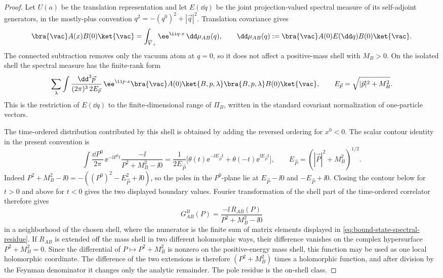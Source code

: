 \begin{proof}
Let \(U(a)\) be the translation representation and let \(E(\dd q)\) be the
joint projection-valued spectral measure of its self-adjoint generators, in
the mostly-plus convention \(q^2=-(q^0)^2+|\vec q|^2\).  Translation
covariance gives
\[
  \bra{\vac}A(x)B(0)\ket{\vac}
  =
  \int_{\overline V_+}
    \ee^{\ii q\cdot x}\,
    \dd\mu_{AB}(q),
  \qquad
  \dd\mu_{AB}(q)
  :=
  \bra{\vac}A(0)E(\dd q)B(0)\ket{\vac}.
\]
The connected subtraction removes only the vacuum atom at \(q=0\), so it
does not affect a positive-mass shell with \(M_B>0\).  On the isolated shell
the spectral measure has the finite-rank form
\[
  \sum_{\lambda}
  \int\frac{\dd^3\vec p}{(2\pi)^3\,2E_{\vec p}}\,
  \ee^{\ii p\cdot x}
  \bra{\vac}A(0)\ket{B,p,\lambda}
  \bra{B,p,\lambda}B(0)\ket{\vac},
  \qquad
  E_{\vec p}=\sqrt{|\vec p|^2+M_B^2}.
  \]
This is the restriction of \(E(\dd q)\) to the finite-dimensional range of
\(\Pi_B\), written in the standard covariant normalization of one-particle
vectors.

The time-ordered distribution contributed by this shell is obtained by
adding the reversed ordering for \(x^0<0\).  The scalar contour identity in
the present convention is
\[
  \int\frac{\dd P^0}{2\pi}\,
    \ee^{-\ii P^0 t}
    \frac{-\ii}{P^2+M_B^2-\ii0}
  =
  \frac{1}{2E_{\vec P}}
  \bigl[
    \theta(t)\ee^{-\ii E_{\vec P}t}
    +
    \theta(-t)\ee^{\ii E_{\vec P}t}
  \bigr],
  \qquad
  E_{\vec P}=(|\vec P|^2+M_B^2)^{1/2}.
\]
Indeed \(P^2+M_B^2-\ii0=-((P^0)^2-E_{\vec P}^2+\ii0)\), so the poles in
the \(P^0\)-plane lie at \(E_{\vec P}-\ii0\) and \(-E_{\vec P}+\ii0\).
Closing the contour below for \(t>0\) and above for \(t<0\) gives the two
displayed boundary values.  Fourier transformation of the shell part of
the time-ordered correlator therefore gives
\[
  G^{B}_{AB}(P)
  =
  \frac{-\ii\,R_{AB}(P)}
       {P^2+M_B^2-\ii0}
\]
in a neighborhood of the chosen shell, where the numerator is the finite
sum of matrix elements displayed in
\eqref{eq:bound-state-spectral-residue}.  If \(R_{AB}\) is extended off the
mass shell in two different holomorphic ways, their difference vanishes on
the complex hypersurface \(P^2+M_B^2=0\).  Since the differential of
\(P\mapsto P^2+M_B^2\) is nonzero on the positive-energy mass shell, this
function may be used as one local holomorphic coordinate.  The difference
of the two extensions is therefore \((P^2+M_B^2)\) times a holomorphic
function, and after division by the Feynman denominator it changes only the
analytic remainder.  The pole residue is the on-shell class.


\end{proof}
